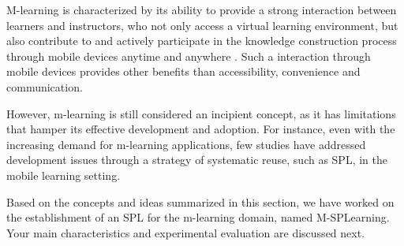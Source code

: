 M-learning is characterized by its ability to provide a strong interaction between learners and instructors, who not only access a virtual learning environment, but also contribute to and actively participate in the knowledge construction process through mobile devices anytime and anywhere \cite{kukulska05}. Such a interaction through mobile devices provides other benefits than accessibility, convenience and communication.

However, m-learning is still considered an incipient concept, as it has limitations that hamper its effective development and adoption. For instance, even with the increasing demand for m-learning applications, few studies have addressed development issues through a strategy of systematic reuse, such as SPL, in the mobile learning setting.  

Based on the concepts and ideas summarized in this section, we have worked on the establishment of an SPL for the m-learning domain, named M-SPLear\allowbreak ning. Your main characteristics and experimental evaluation are discussed next.
